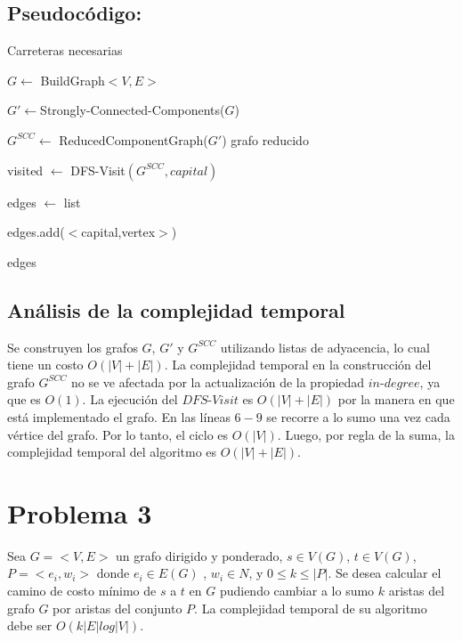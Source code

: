 \documentclass[a4paper,10pt]{article}
\begin{document}
	\subsection{Pseudoc\'odigo:}   
	
	\begin{algorithm}[H] 
		\caption{Carreteras necesarias}            
		\begin{algorithmic}[1]
			\label{MinimumRoads}
			\State $G \gets$ BuildGraph$<V,E>$
			
			\State $G' \gets $Strongly-Connected-Components($G$)   
			
			\State $G^{SCC} \gets$ ReducedComponentGraph($G'$)    \Comment grafo reducido
			
			\State visited $\gets$ DFS-Visit$(G^{SCC},capital)$
			
			\State edges $\gets$ list    
			
			\State edges.add($<$capital,vertex$>$)
			\EndIf
			\EndFor
			
			 edges       
		\end{algorithmic}
	\end{algorithm} 
	\subsection{Análisis de la complejidad temporal}
	Se construyen los grafos $G$, $G'$ y $G^{SCC}$ utilizando listas de adyacencia, lo cual tiene un costo $O(|V| + |E|)$. La complejidad temporal en la construcci\'on del grafo $G^{SCC}$ no se ve afectada por la actualizaci\'on de la propiedad $in$-$degree$, ya que es $O(1)$. La ejecuci\'on del $DFS$-$Visit$ es $O(|V| + |E|)$ por la manera en que est\'a implementado el grafo. En las l\'ineas $6-9$ se recorre a lo sumo una vez cada v\'ertice del grafo. Por lo tanto, el ciclo es $O(|V|)$. Luego, por regla de la suma, la complejidad temporal del algoritmo es $O(|V| + |E|)$.
	\section{Problema 3}
	Sea $G = <V,E>$ un grafo dirigido y ponderado, $s \in V (G)$, $t \in V (G)$, $P = {<e_i,w_i>}$ donde $e_i \in E(G)$ , $w_i  \in N$, y $0 \leq k \leq |P|$. Se desea calcular el camino de costo mínimo de $s$ a $t$ en $G$ pudiendo cambiar a lo sumo $k$ aristas del grafo $G$ por aristas del conjunto $P$. La complejidad temporal de su algoritmo debe ser $O(k|E|log|V |)$.
	
\end{document}
